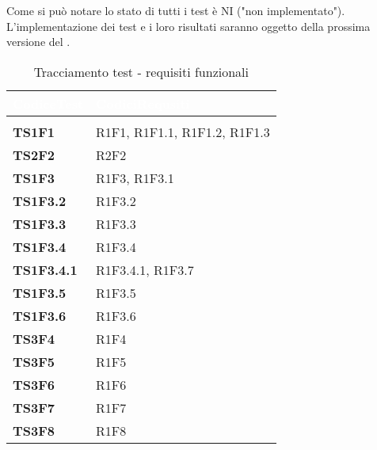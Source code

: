 Come si può notare lo stato di tutti i test è NI ("non implementato"). L'implementazione dei test e i loro risultati saranno oggetto della prossima versione del \PdQv{}.

\renewcommand{\arraystretch}{1.5}
\renewcommand{\arraystretch}{1.5}
\renewcommand\extrarowheight{1.5pt}
\begin{longtable}{C{2.5cm} C{10cm} } 
		\textcolor{white}{\textbf{CodiceTest}} & 
		\textcolor{white}{\textbf{CodiciRequsiti}} \\
		\endfirsthead
		 \\
	    \endfoot
	    \caption{Tracciamento test - requisiti funzionali}
	    \endlastfoot
		\hline
		\textbf{TS1F1} & R1F1, R1F1.1, R1F1.2, R1F1.3 \\
		\textbf{TS2F2} & R2F2 \\
		\textbf{TS1F3} & R1F3, R1F3.1 \\
		\textbf{TS1F3.2} & R1F3.2 \\
		\textbf{TS1F3.3} & R1F3.3 \\
		\textbf{TS1F3.4} & R1F3.4 \\
		\textbf{TS1F3.4.1} & R1F3.4.1, R1F3.7 \\
		\textbf{TS1F3.5} & R1F3.5 \\
		\textbf{TS1F3.6} & R1F3.6 \\
		\textbf{TS3F4} & R1F4 \\
		\textbf{TS3F5} & R1F5 \\
		\textbf{TS3F6} & R1F6 \\
		\textbf{TS3F7} & R1F7 \\
		\textbf{TS3F8} & R1F8 \\
\end{longtable}